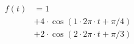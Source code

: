 \begin{center}
\begin{align*}
f(t) &= 1 \\
&+ 4 \cdot \cos( 1 \cdot 2 \pi \cdot t +\pi/4) \\
&+ 2 \cdot \cos( 2 \cdot 2 \pi \cdot t + \pi/3)
\end{align*}
\end{center}
